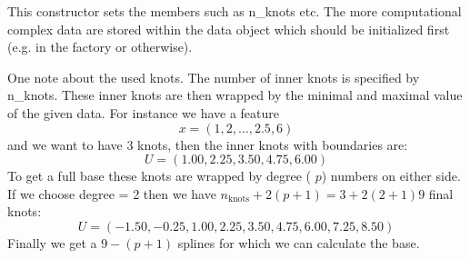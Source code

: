 This constructor sets the members such as n\+\_\+knots etc. The more computational complex data are stored within the data object which should be initialized first (e.\+g. in the factory or otherwise).

One note about the used knots. The number of inner knots is specified by {\ttfamily n\+\_\+knots}. These inner knots are then wrapped by the minimal and maximal value of the given data. For instance we have a feature \[ x = (1, 2, \dots, 2.5, 6) \] and we want to have 3 knots, then the inner knots with boundaries are\+: \[ U = (1.00, 2.25, 3.50, 4.75, 6.00) \] To get a full base these knots are wrapped by {\ttfamily degree} ( $p$) numbers on either side. If we choose {\ttfamily degree = 2} then we have $n_\mathrm{knots} + 2(p + 1) = 3 + 2(2 + 1) 9$ final knots\+: \[ U = (-1.50, -0.25, 1.00, 2.25, 3.50, 4.75, 6.00, 7.25, 8.50) \] Finally we get a $9 - (p + 1)$ splines for which we can calculate the base.


